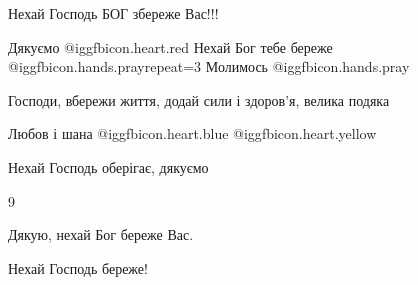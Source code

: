  
 
 
 
 
\qqSecCmt

\begin{itemize} %
Нехай Господь БОГ збереже Вас!!!

Дякуємо @igg{fbicon.heart.red}
Нехай Бог тебе береже @igg{fbicon.hands.pray}{repeat=3} 
Молимось @igg{fbicon.hands.pray} 

Господи, вбережи життя, додай сили і здоров'я, велика подяка

Любов і шана @igg{fbicon.heart.blue}  @igg{fbicon.heart.yellow} 

Нехай Господь оберігає, дякуємо

9

Дякую, нехай Бог береже Вас.

Нехай Господь береже!
\end{itemize} %
